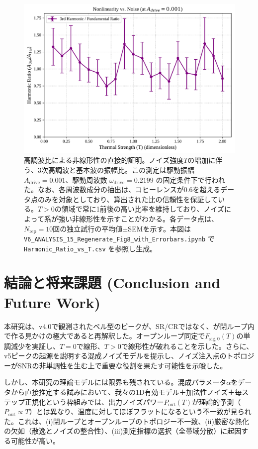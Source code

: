 \documentclass[a4paper,11pt,ja=standard,lualatex]{bxjsarticle}
\begin{document}
\begin{figure}[H]
\centering
\includegraphics[width=0.8\linewidth]{v6_fig08_harmonic_ratio_with_errors.pdf}
\caption{高調波比による非線形性の直接的証明。ノイズ強度$T$の増加に伴う、3次高調波と基本波の振幅比。この測定は駆動振幅 $A_{\mathrm{drive}}=0.001$、駆動周波数 $\omega_{\mathrm{drive}}=0.2199$ の固定条件下で行われた。なお、各周波数成分の抽出は、コヒーレンスが0.6を超えるデータ点のみを対象としており、算出された比の信頼性を保証している。$T>0$の領域で常に1前後の高い比率を維持しており、ノイズによって系が強い非線形性を示すことがわかる。各データ点は、$N_{\mathrm{rep}}=10$回の独立試行の平均値$\pm$SEMを示す。本図は \texttt{V6\_ANALYSIS\_15\_Regenerate\_Fig8\_with\_Errorbars.ipynb} で \texttt{Harmonic\_Ratio\_vs\_T.csv} を参照し生成。}
\label{fig:harmonic_ratio}
\end{figure}

\FloatBarrier

\section{結論と将来課題 (Conclusion and Future Work)}
本研究は、v4.0で観測されたベル型のピークが、SR/CRではなく、が閉ループ内で作る見かけの極大であると再解釈した。オープンループ同定で$F_{\mathrm{sig},0}(T)$の単調減少を実証し、$T=0$で線形、$T>0$で線形性が破れることを示した。さらに、v5ピークの起源を説明する混成ノイズモデルを提示し、ノイズ注入点のトポロジーがSNRの非単調性を生む上で重要な役割を果たす可能性を示唆した。

しかし、本研究の理論モデルには限界も残されている。混成パラメータ$\alpha$をデータから直接推定する試みにおいて、我々の1D有効モデル＋加法性ノイズ＋毎ステップ正規化という枠組みでは、出力ノイズパワー$P_{\mathrm{out}}(T)$が理論的予測（$P_{\mathrm{out}} \propto T$）とは異なり、温度に対してほぼフラットになるという不一致が見られた。これは、(i)閉ループとオープンループのトポロジー不一致、(ii)厳密な熱化の欠如（散逸とノイズの整合性）、(iii)測定指標の選択（全帯域分散）に起因する可能性が高い。
\end{document}
